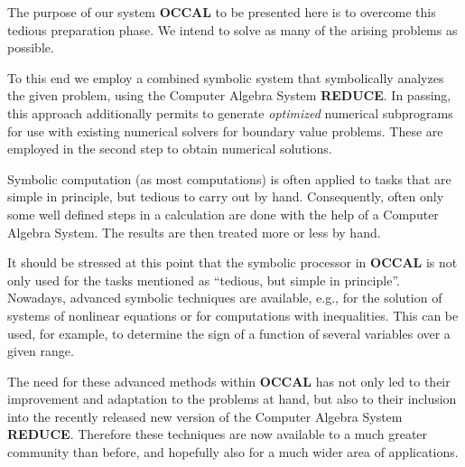 \documentclass[12pt,a4paper]{article}
\newcommand{\OCCAL}{{\sf\bf OCCAL}}
\newcommand{\REDUCE}{{\sf\bf REDUCE}}
\begin{document}
The purpose of our system \OCCAL{} to be presented here is to overcome
this tedious preparation phase. We intend to solve as many of the
arising problems as possible.

To this end we employ a combined symbolic system that
symbolically analyzes the given problem, using the
Computer Algebra System \REDUCE.  In passing, this approach
additionally permits to generate {\em optimized\/} numerical
subprograms for use with existing numerical solvers for boundary value
problems. These are employed in the second step to obtain numerical
solutions.

Symbolic computation (as most computations) is often applied to tasks
that are simple in principle, but tedious to carry out by hand.
Consequently, often only some well defined steps in a calculation are
done with the help of a Computer Algebra System. The results are then
treated more or less by hand.


It should be stressed at this point that the symbolic processor in
\OCCAL{} is not only used for the tasks mentioned as ``tedious, but
simple in principle''.  Nowadays, advanced symbolic techniques are
available, e.g., for the solution of systems of nonlinear equations or
for computations with inequalities. This can be used, for example, to
determine the sign of a function of several variables over a given
range.

The need for these advanced methods within \OCCAL{} has not only led
to their improvement and adaptation to the problems at hand, but also
to their inclusion into the recently released new version of the
Computer Algebra System \REDUCE. Therefore these techniques are now
available to a much greater community than before, and hopefully also
for a much wider area of applications.
\end{document}
